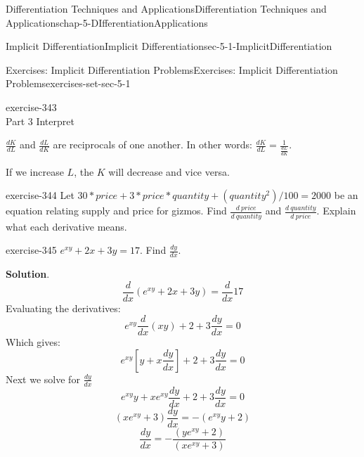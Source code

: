 \documentclass[oneside,10pt,]{book}
\numberwithin{equation}{section}
\begin{document}
\begin{chapterptx}{Differentiation Techniques and Applications}{}{Differentiation Techniques and Applications}{}{}{chap-5-DIfferentiationApplications}
\begin{sectionptx}{Implicit Differentiation}{}{Implicit Differentiation}{}{}{sec-5-1-ImplicitDifferentiation}
\begin{exercises-subsection-numberless}{Exercises: Implicit Differentiation Problems}{}{Exercises: Implicit Differentiation Problems}{}{}{exercises-set-sec-5-1}
\begin{divisionexercise}{13}{}{}{exercise-343}
\begin{equation*}
\end{equation*}
\hypertarget{p-1926}{}%
Part 3 Interpret%
\par
\hypertarget{p-1927}{}%
\(\frac{dK}{dL}\) and \(\frac{dL}{dK}\) are reciprocals of one another. In other words: \(\frac{dK}{dL}=\frac{1}{\frac{dL}{dK}}\).%
\par
\hypertarget{p-1928}{}%
If we increase \(L\), the \(K\) will decrease and vice versa.%
\end{divisionexercise}%
\begin{divisionexercise}{14}{}{}{exercise-344}%
\hypertarget{p-1929}{}%
Let \(30*price+3*price*quantity+(quantity^2)/100=2000\) be an equation relating supply and price for gizmos.   Find \(\frac{d\ price}{d\ quantity}\) and \(\frac{d\ quantity}{d\ price}\).  Explain what each derivative means.%
\end{divisionexercise}%
\begin{divisionexercise}{15}{}{}{exercise-345}%
\hypertarget{p-1930}{}%
\(e^{xy}+2x+3y=17\).	Find \(\frac{dy}{dx}\).%
\par\smallskip%
\noindent\textbf{Solution}.\hypertarget{solution-173}{}\quad%
%
\begin{equation*}
\frac{d}{dx}  (e^{xy}+2x+3y)= \frac{d}{dx}  17
\end{equation*}
\hypertarget{p-1931}{}%
Evaluating the derivatives:%
%
\begin{equation*}
e^{xy}   \frac{d}{dx}  (xy)+2+3 \frac{dy}{dx}=0
\end{equation*}
\hypertarget{p-1932}{}%
Which gives:%
%
\begin{equation*}
e^{xy} [y+x \frac{dy}{dx}]+2+3 \frac{dy}{dx}=0
\end{equation*}
\hypertarget{p-1933}{}%
Next we solve for \(\frac{dy}{dx}\)%
%
\begin{equation*}
e^{xy} y+xe^{xy}  \frac{dy}{dx}+2+3 \frac{dy}{dx}=0
\end{equation*}
%
\begin{equation*}
(xe^{xy}+3)\frac{dy}{dx}=-(e^{xy} y+2)
\end{equation*}
%
\begin{equation*}
\frac{dy}{dx}=-\frac{(y e^{xy}+2)}{(x e^{xy}+3)}
\end{equation*}
\end{divisionexercise}%
\end{exercises-subsection-numberless}
\end{sectionptx}
%
%
\typeout{************************************************}

\end{chapterptx}
\end{document}
